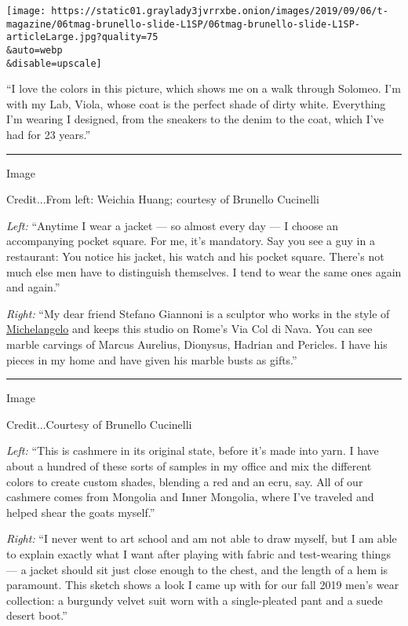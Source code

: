 \texttt{[image: https://static01.graylady3jvrrxbe.onion/images/2019/09/06/t-magazine/06tmag-brunello-slide-L1SP/06tmag-brunello-slide-L1SP-articleLarge.jpg?quality=75\\\&auto=webp\\\&disable=upscale]}

``I love the colors in this picture, which shows me on a walk through
Solomeo. I'm with my Lab, Viola, whose coat is the perfect shade of
dirty white. Everything I'm wearing I designed, from the sneakers to the
denim to the coat, which I've had for 23 years.''

\begin{center}\rule{0.5\linewidth}{\linethickness}\end{center}

Image

Credit...From left: Weichia Huang; courtesy of Brunello Cucinelli

\emph{Left:} ``Anytime I wear a jacket --- so almost every day --- I
choose an accompanying pocket square. For me, it's mandatory. Say you
see a guy in a restaurant: You notice his jacket, his watch and his
pocket square. There's not much else men have to distinguish themselves.
I tend to wear the same ones again and again.''

\emph{Right:} ``My dear friend Stefano Giannoni is a sculptor who works
in the style of
\href{https://www.nytimes3xbfgragh.onion/topic/person/michelangelo-buonarroti}{Michelangelo}
and keeps this studio on Rome's Via Col di Nava. You can see marble
carvings of Marcus Aurelius, Dionysus, Hadrian and Pericles. I have his
pieces in my home and have given his marble busts as gifts.''

\begin{center}\rule{0.5\linewidth}{\linethickness}\end{center}

Image

Credit...Courtesy of Brunello Cucinelli

\emph{Left:} ``This is cashmere in its original state, before it's made
into yarn. I have about a hundred of these sorts of samples in my office
and mix the different colors to create custom shades, blending a red and
an ecru, say. All of our cashmere comes from Mongolia and Inner
Mongolia, where I've traveled and helped shear the goats myself.''

\emph{Right:} ``I never went to art school and am not able to draw
myself, but I am able to explain exactly what I want after playing with
fabric and test-wearing things --- a jacket should sit just close enough
to the chest, and the length of a hem is paramount. This sketch shows a
look I came up with for our fall 2019 men's wear collection: a burgundy
velvet suit worn with a single-pleated pant and a suede desert boot.''

